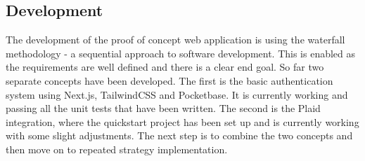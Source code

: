 \subsection{Development}
The development of the proof of concept web application is using the waterfall methodology - a sequential approach to software development. This is enabled as the requirements are well defined and there is a clear end goal. So far two separate concepts have been developed. The first is the basic authentication system using Next.js, TailwindCSS and Pocketbase. It is currently working and passing all the unit tests that have been written. The second is the Plaid integration, where the quickstart project has been set up and is currently working with some slight adjustments. The next step is to combine the two concepts and then move on to repeated strategy implementation.

